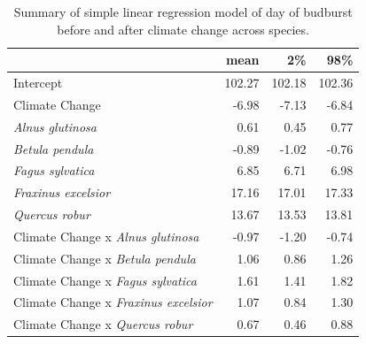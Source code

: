 \documentclass{article}\usepackage[]{graphicx}\usepackage[]{color}
\begin{document}
\begin{table}[H]
\centering
\caption{Summary of simple linear regression model of day of budburst before and after climate change across species.} 
\begin{tabular}{lrrr}
  \hline
 & mean & 2\% & 98\% \\ 
  \hline
Intercept & 102.27 & 102.18 & 102.36 \\ 
  Climate Change & -6.98 & -7.13 & -6.84 \\ 
  \textit{Alnus glutinosa} & 0.61 & 0.45 & 0.77 \\ 
  \textit{Betula pendula} & -0.89 & -1.02 & -0.76 \\ 
  \textit{Fagus sylvatica} & 6.85 & 6.71 & 6.98 \\ 
  \textit{Fraxinus excelsior} & 17.16 & 17.01 & 17.33 \\ 
  \textit{Quercus robur} & 13.67 & 13.53 & 13.81 \\ 
  Climate Change x \textit{Alnus glutinosa} & -0.97 & -1.20 & -0.74 \\ 
  Climate Change x \textit{Betula pendula} & 1.06 & 0.86 & 1.26 \\ 
  Climate Change x \textit{Fagus sylvatica} & 1.61 & 1.41 & 1.82 \\ 
  Climate Change x \textit{Fraxinus excelsior} & 1.07 & 0.84 & 1.30 \\ 
  Climate Change x \textit{Quercus robur} & 0.67 & 0.46 & 0.88 \\ 
   \hline
\end{tabular}
\end{table}
\end{document}
